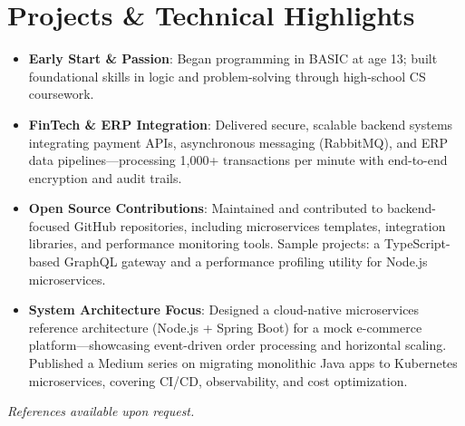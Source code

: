 \documentclass[11pt]{article}
\begin{document}
\section*{Projects \& Technical Highlights}
\begin{itemize}\itemsep0pt
  \item \textbf{Early Start \& Passion}: Began programming in BASIC at age 13; built foundational skills in logic and problem-solving through high-school CS coursework.
  \item \textbf{FinTech \& ERP Integration}: Delivered secure, scalable backend systems integrating payment APIs, asynchronous messaging (RabbitMQ), and ERP data pipelines—processing 1,000+ transactions per minute with end-to-end encryption and audit trails.
  \item \textbf{Open Source Contributions}: Maintained and contributed to backend-focused GitHub repositories, including microservices templates, integration libraries, and performance monitoring tools. Sample projects: a TypeScript-based GraphQL gateway and a performance profiling utility for Node.js microservices.
  \item \textbf{System Architecture Focus}: Designed a cloud-native microservices reference architecture (Node.js + Spring Boot) for a mock e-commerce platform—showcasing event-driven order processing and horizontal scaling. Published a Medium series on migrating monolithic Java apps to Kubernetes microservices, covering CI/CD, observability, and cost optimization.
\end{itemize}

\vfill
\noindent\textit{References available upon request.}
\end{document}
